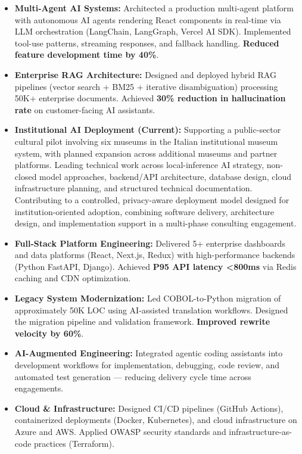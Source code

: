 \documentclass[11pt, letterpaper]{article}
\begin{document}
\begin{itemize}
    \item \textbf{Multi-Agent AI Systems:} Architected a production multi-agent platform with autonomous AI agents rendering React components in real-time via LLM orchestration (LangChain, LangGraph, Vercel AI SDK). Implemented tool-use patterns, streaming responses, and fallback handling. \textbf{Reduced feature development time by 40\%}.
    \item \textbf{Enterprise RAG Architecture:} Designed and deployed hybrid RAG pipelines (vector search + BM25 + iterative disambiguation) processing 50K+ enterprise documents. Achieved \textbf{30\% reduction in hallucination rate} on customer-facing AI assistants.
    \item \textbf{Institutional AI Deployment (Current):} Supporting a public-sector cultural pilot involving six museums in the Italian institutional museum system, with planned expansion across additional museums and partner platforms. Leading technical work across local-inference AI strategy, non-closed model approaches, backend/API architecture, database design, cloud infrastructure planning, and structured technical documentation. Contributing to a controlled, privacy-aware deployment model designed for institution-oriented adoption, combining software delivery, architecture design, and implementation support in a multi-phase consulting engagement.
    \item \textbf{Full-Stack Platform Engineering:} Delivered 5+ enterprise dashboards and data platforms (React, Next.js, Redux) with high-performance backends (Python FastAPI, Django). Achieved \textbf{P95 API latency <800ms} via Redis caching and CDN optimization.
    \item \textbf{Legacy System Modernization:} Led COBOL-to-Python migration of approximately 50K LOC using AI-assisted translation workflows. Designed the migration pipeline and validation framework. \textbf{Improved rewrite velocity by 60\%}.
    \item \textbf{AI-Augmented Engineering:} Integrated agentic coding assistants into development workflows for implementation, debugging, code review, and automated test generation --- reducing delivery cycle time across engagements.
    \item \textbf{Cloud \& Infrastructure:} Designed CI/CD pipelines (GitHub Actions), containerized deployments (Docker, Kubernetes), and cloud infrastructure on Azure and AWS. Applied OWASP security standards and infrastructure-as-code practices (Terraform).
\end{itemize}
\end{document}
